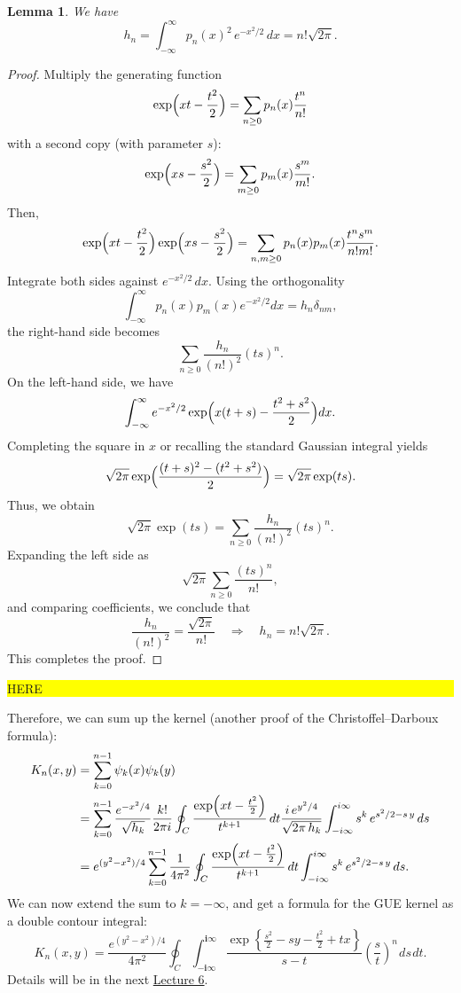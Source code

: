 \documentclass[letterpaper,11pt,oneside,reqno]{article}
\numberwithin{equation}{section}
\newcommand{\ssp}{\hspace{1pt}}
\newtheorem{lemma}[proposition]{Lemma}
\theoremstyle{definition}
\begin{document}
\begin{lemma}
	We have 
	\begin{equation*}
		h_n=\int_{-\infty}^{\infty} p_n(x)^2\,e^{-x^2/2}\,dx=n!\sqrt{2\pi}.
	\end{equation*}
\end{lemma}
\begin{proof}
Multiply the generating function
\[
	\exp\Bigl(xt-\frac{t^2}{2}\Bigr)=\sum_{n\ge0}p_n(x)\frac{t^n}{n!}
\]
with a second copy (with parameter \(s\)):
\[
	\exp\Bigl(xs-\frac{s^2}{2}\Bigr)=\sum_{m\ge0}p_m(x)\frac{s^m}{m!}.
\]
Then,
\[
	\exp\Bigl(xt-\frac{t^2}{2}\Bigr)\exp\Bigl(xs-\frac{s^2}{2}\Bigr)
	=\sum_{n,m\ge0}p_n(x)p_m(x)\frac{t^n s^m}{n!m!}.
\]
Integrate both sides against \(e^{-x^2/2}\,dx\). Using the orthogonality
\[
	\int_{-\infty}^{\infty}p_n(x)p_m(x)e^{-x^2/2}dx=h_n\delta_{nm},
\]
the right-hand side becomes
\[
	\sum_{n\ge0}\frac{h_n}{(n!)^2}(ts)^n.
\]
On the left-hand side, we have
\[
	\int_{-\infty}^{\infty}e^{-x^2/2}\exp\Bigl(x(t+s)-\frac{t^2+s^2}{2}\Bigr)dx.
\]
Completing the square in \(x\) or recalling the standard Gaussian integral yields
\[
	\sqrt{2\pi}\exp\Bigl(\frac{(t+s)^2-(t^2+s^2)}{2}\Bigr)
	=\sqrt{2\pi}\exp(ts).
\]
Thus, we obtain
\[
	\sqrt{2\pi}\exp(ts)=\sum_{n\ge0}\frac{h_n}{(n!)^2}(ts)^n.
\]
Expanding the left side as
\[
	\sqrt{2\pi}\sum_{n\ge0}\frac{(ts)^n}{n!},
\]
and comparing coefficients, we conclude that
\[
	\frac{h_n}{(n!)^2}=\frac{\sqrt{2\pi}}{n!}\quad\Longrightarrow\quad h_n=n!\sqrt{2\pi}.
\]
This completes the proof.
\end{proof}

\colorbox{yellow}{\parbox{.7\textwidth}{HERE}}

Therefore, we can sum up the kernel (another proof of the Christoffel--Darboux formula):
\begin{align*}
	K_n(x,y)&=
	\sum_{k=0}^{n-1}\psi_k(x)\psi_k(y)
	\\&=
	\sum_{k=0}^{n-1}
	\frac{e^{-x^2/4}}{\sqrt{h_k}}\frac{k!}{2\pi i}\oint_C\frac{\exp\Bigl(xt-\frac{t^2}{2}\Bigr)}{t^{k+1}}\,dt
	\frac{i\,e^{y^2/4}}{\sqrt{2\pi\,h_k}}
	\int_{-i\infty}^{i\infty}s^k\,e^{s^2/2-s\,y}\,ds
	\\&=
	e^{(y^2-x^2)/4}
	\sum_{k=0}^{n-1}
	\frac{1}{4\pi^2}\oint_C\frac{\exp\Bigl(xt-\frac{t^2}{2}\Bigr)}{t^{k+1}}\,dt
	\int_{-i\infty}^{i\infty}s^k\,e^{s^2/2-s\,y}\,ds.
\end{align*}
We can now extend the sum to
$k=-\infty$, and get a formula for the
GUE kernel as a double contour integral:
\begin{equation*}
	K_n(x,y)=\frac{e^{(y^2-x^2)/4}}{4\pi^2}
	\oint_C
	\int_{-\mathbf{i}\infty}^{\mathbf{i}\infty}
	\frac{\exp\left\{ \frac{s^2}{2}-sy-\frac{t^2}{2}+tx \right\}}{s-t}\left( \frac{s}{t} \right)^n\ssp ds\ssp dt.
\end{equation*}
Details will be in the next
\href{https://lpetrov.cc/rmt25/rmt25-notes/rmt2025-l06.pdf}{Lecture 6}.
\end{document}
